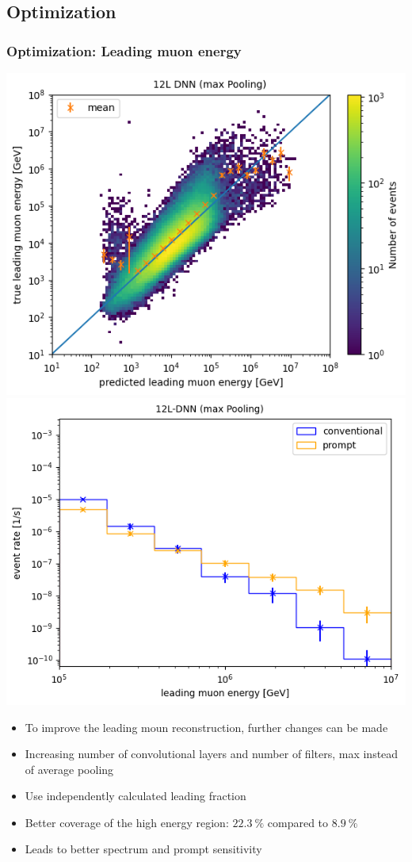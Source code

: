\documentclass[aspectratio=1610, 9pt]{beamer}
\begin{document}
\subsection{Optimization}
\begin{frame}
  \frametitle{Optimization: Leading muon energy}
  \includegraphics[scale=0.45]{Plots/Correlation leading 12L max}
  \includegraphics[scale=0.45]{Plots/muon flux calculated 12L max}
  \begin{itemize}
    \item To improve the leading moun reconstruction, further changes can be made
    \item Increasing number of convolutional layers and number of filters, max instead of average pooling
    \item Use independently calculated leading fraction
    \item Better coverage of the high energy region: $\SI{22,3}{\percent}$ compared to $\SI{8,9}{\percent}$
    \item Leads to better spectrum and prompt sensitivity
  \end{itemize}
\end{frame}
\end{document}
